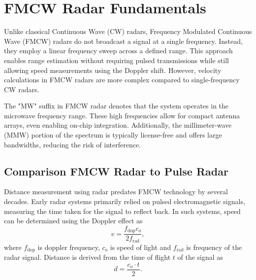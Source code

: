 \def\PageLayout{single-no-print}
\def\DocLanguage{en}
\def\PackagesIncludeTikz{yes}
\def\PackagesIncludeBib{yes}










\newcommand{\sidar}{SiRad Easy\textsuperscript{\copyright} }
\newcommand{\boldred}[1]{\textbf{\textcolor{red}{#1}}}
\newcommand{\boldblue}[1]{\textbf{\textcolor{blue}{#1}}}






\tableofcontents

\newpage
{}
\setcounter{page}{1}





\pagestyle{fancy}

\chapter{FMCW Radar Fundamentals}

Unlike classical Continuous Wave (CW) radars, Frequency Modulated Continuous Wave (FMCW) radars do not broadcast a signal at a single frequency.
Instead, they employ a linear frequency sweep across a defined range.
This approach enables range estimation without requiring pulsed transmissions while still allowing speed measurements using the Doppler shift.
However, velocity calculations in FMCW radars are more complex compared to single-frequency CW radars.

The "MW" suffix in FMCW radar denotes that the system operates in the microwave frequency range.
These high frequencies allow for compact antenna arrays, even enabling on-chip integration.
Additionally, the millimeter-wave (MMW) portion of the spectrum is typically license-free \cite{spektrumCTU} and offers large bandwidths, reducing the risk of interference.

\section{Comparison FMCW Radar to Pulse Radar}

Distance measurement using radar predates FMCW technology by several decades.
Early radar systems primarily relied on pulsed electromagnetic signals, measuring the time taken for the signal to reflect back.
In such systems, speed can be determined using the Doppler effect as
\begin{equation}
	v = \frac{f_\mathrm{dop} c_o}{2f_\mathrm{rad}},
	\label{eq:dopler}
\end{equation}
where $f_\mathrm{dop}$ is doppler frequency, $c_o$ is speed of light and $f_\mathrm{rad}$ is frequency of the radar signal.
Distance is derived from the time of flight $t$ of the signal as
\begin{equation}
	d = \frac{c_o \cdot t}{2}.
	\label{eq:distance}
\end{equation}

